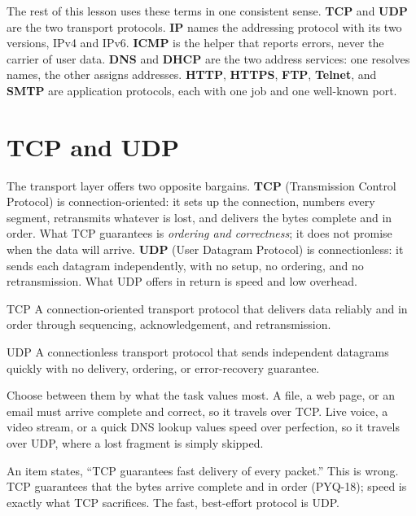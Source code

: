 The rest of this lesson uses these terms in one consistent sense. \textbf{TCP}
and \textbf{UDP} are the two transport protocols. \textbf{IP} names the
addressing protocol with its two versions, IPv4 and IPv6. \textbf{ICMP} is the
helper that reports errors, never the carrier of user data. \textbf{DNS} and
\textbf{DHCP} are the two address services: one resolves names, the other
assigns addresses. \textbf{HTTP}, \textbf{HTTPS}, \textbf{FTP},
\textbf{Telnet}, and \textbf{SMTP} are application protocols, each with one
job and one well-known port.

\section{TCP and UDP}
The transport layer offers two opposite bargains. \textbf{TCP} (Transmission
Control Protocol) is connection-oriented: it sets up the connection, numbers
every segment, retransmits whatever is lost, and delivers the bytes complete
and in order. What TCP guarantees is \emph{ordering and correctness}; it does
not promise when the data will arrive. \textbf{UDP} (User Datagram Protocol)
is connectionless: it sends each datagram independently, with no setup, no
ordering, and no retransmission. What UDP offers in return is speed and low
overhead.

\begin{definitionbox}{TCP}
A connection-oriented transport protocol that delivers data reliably and in
order through sequencing, acknowledgement, and retransmission.
\end{definitionbox}

\begin{definitionbox}{UDP}
A connectionless transport protocol that sends independent datagrams quickly
with no delivery, ordering, or error-recovery guarantee.
\end{definitionbox}

Choose between them by what the task values most. A file, a web page, or an
email must arrive complete and correct, so it travels over TCP. Live voice, a
video stream, or a quick DNS lookup values speed over perfection, so it
travels over UDP, where a lost fragment is simply skipped.

\begin{example}
An item states, ``TCP guarantees fast delivery of every packet.'' This is
wrong. TCP guarantees that the bytes arrive complete and in order (PYQ-18);
speed is exactly what TCP sacrifices. The fast, best-effort protocol is UDP.
\end{example}

